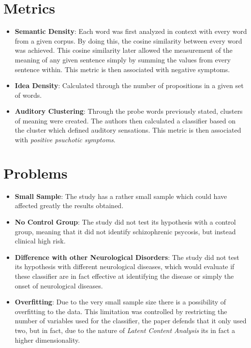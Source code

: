 \documentclass{Paper_Summary}
\begin{document}
\section{Metrics}
    \begin{itemize}
        \item \textbf{Semantic Density}: Each word was first analyzed in context with every word from a given corpus. By doing this, the cosine similarity between every word was achieved. This cosine similarity later allowed the measurement of the meaning of any given sentence simply by summing the values from every sentence within. This metric is then associated with negative symptoms.
        \item \textbf{Idea Density}: Calculated through the number of propositions in a given set of words.
        \item \textbf{Auditory Clustering}: Through the probe words previously stated, clusters of meaning were created. The authors then calculated a classifier based on the cluster which defined auditory sensations. This metric is then associated with \emph{positive psuchotic symptoms}.
    \end{itemize}

\section{Problems}
    \begin{itemize}
        \item \textbf{Small Sample}: The study has a rather small sample which could have affected greatly the results obtained.
        \item \textbf{No Control Group}: The study did not test its hypothesis with a control group, meaning that it did not identify schizophrenic psycosis, but instead clinical high risk.
        \item \textbf{Difference with other Neurological Disorders}: The study did not test its hypothesis with different neurological diseases, which would evaluate if these classifier are in fact effective at identifying the disease or simply the onset of neurological diseases.
        \item \textbf{Overfitting}: Due to the very small sample size there is a possibility of overfitting to the data. This limitation was controlled by restricting the number of variables used for the classifier, the paper defends that it only used two, but in fact, due to the nature of \emph{Latent Content Analysis} its in fact a higher dimensionality.
    \end{itemize}
\end{document}

